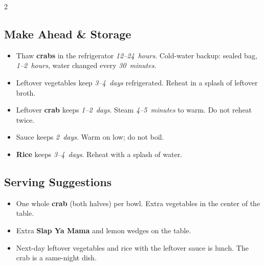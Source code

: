 \documentclass[11pt,letterpaper]{article}
\begin{document}
{\begin{multicols}{2}
\subsection*{Make Ahead \& Storage}
\begin{itemize}
    \item Thaw \textbf{crabs} in the refrigerator \textit{12--24~hours}. Cold-water backup: sealed bag, \textit{1--2~hours}, water changed every \textit{30~minutes}.
    \item Leftover vegetables keep \textit{3--4~days} refrigerated. Reheat in a splash of leftover broth.
    \item Leftover \textbf{crab} keeps \textit{1--2~days}. Steam \textit{4--5~minutes} to warm. Do not reheat twice.
    \item Sauce keeps \textit{2~days}. Warm on low; do not boil.
    \item \textbf{Rice} keeps \textit{3--4~days}. Reheat with a splash of water.
\end{itemize}

\subsection*{Serving Suggestions}
\begin{itemize}
    \item One whole \textbf{crab} (both halves) per bowl. Extra vegetables in the center of the table.
    \item Extra \textbf{Slap Ya Mama} and lemon wedges on the table.
    \item Next-day leftover vegetables and rice with the leftover sauce is lunch. The crab is a same-night dish.
\end{itemize}

\end{multicols}
}
\end{document}
